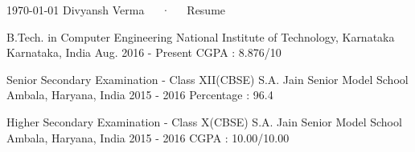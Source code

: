 \documentclass[11pt, a4paper]{awesome-cv}
\begin{document}
\makecvheader[C]

\makecvfooter
  {\today}
  {Divyansh Verma~~~·~~~Resume}
  {\thepage}




\begin{cventries}

  \cventry
    {B.Tech. in Computer Engineering} %
    {National Institute of Technology, Karnataka} %
    {Karnataka, India} %
    {Aug. 2016 - Present} %
    {CGPA : 8.876/10}

\end{cventries}
\begin{cventries}

  \cventry
    {Senior Secondary Examination - Class XII(CBSE)} %
    {S.A. Jain Senior Model School} %
    {Ambala, Haryana, India} %
    {2015 - 2016} %
    {Percentage : 96.4}
\end{cventries}


\begin{cventries}

  \cventry
    {Higher Secondary Examination - Class X(CBSE)} %
    {S.A. Jain Senior Model School} %
    {Ambala, Haryana, India} %
    {2015 - 2016} %
    {CGPA : 10.00/10.00}
\end{cventries}
\end{document}
